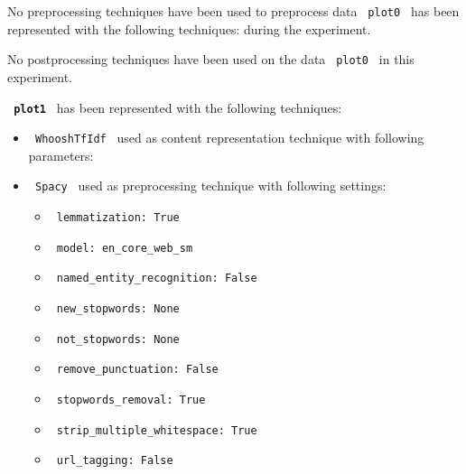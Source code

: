 \documentclass[11pt]{article}
\begin{document}
No preprocessing techniques have been used to preprocess data \lstinline[style=verbatim-text]| plot0 | has been represented with the following techniques:
 during the experiment.
\hfill\break
\hfill\break



No postprocessing techniques have been used on the data \lstinline[style=verbatim-text]| plot0 | in this experiment.
\hfill\break
\hfill\break



\textbf{\lstinline[style=verbatim-text]| plot1 |} has been represented with the following techniques:
\hfill\break
\hfill\break

\begin{itemize}
                                                            
            \item
        \verb| WhooshTfIdf | used as content representation technique with following parameters:
        \begin{itemize}
                    \end{itemize}
    \end{itemize}
\hfill\break
\hfill\break



\begin{itemize}
    \item
     \verb| Spacy | used as preprocessing technique with following settings:
     \begin{itemize}
             \item
            \verb| lemmatization: True|
             \item
            \verb| model: en_core_web_sm|
             \item
            \verb| named_entity_recognition: False|
             \item
            \verb| new_stopwords: None|
             \item
            \verb| not_stopwords: None|
             \item
            \verb| remove_punctuation: False|
             \item
            \verb| stopwords_removal: True|
             \item
            \verb| strip_multiple_whitespace: True|
             \item
            \verb| url_tagging: False|
           \end{itemize}
\end{itemize}
\hfill\break
\hfill\break
\end{document}
